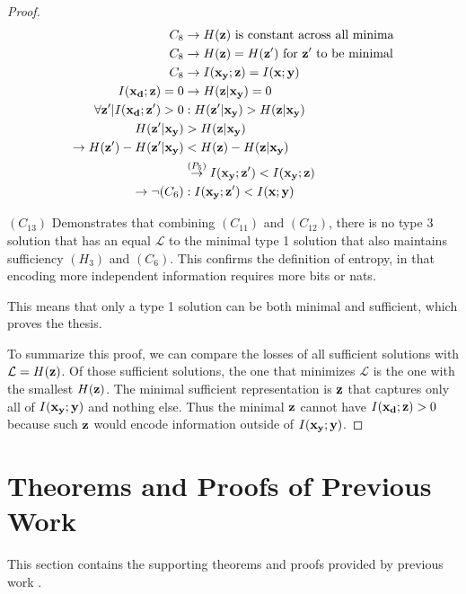 \begin{theorem}
\begin{proof}
$$
\begin{aligned}
    C_8 &\rightarrow  H({\mathbf{z}}) \text{ is constant across all minima}\\
    C_8 &\rightarrow  H({\mathbf{z}}) = H({\mathbf{z}}')\text{ for } {\mathbf{z}}' \text{ to be minimal}\\
    C_8 &\rightarrow  I({\mathbf{x}}_{\mathbf{y}}; {\mathbf{z}}) = I({\mathbf{x}}; {\mathbf{y}})\\
    I({\mathbf{x}}_{\mathbf{d}}; {\mathbf{z}}) = 0 &\rightarrow H({\mathbf{z}}| {\mathbf{x}}_{\mathbf{y}}) = 0 \\
    \forall {\mathbf{z}}'|I({\mathbf{x}}_{\mathbf{d}}; {\mathbf{z}}') > 0  &:  H({\mathbf{z}}'| {\mathbf{x}}_{\mathbf{y}}) > H({\mathbf{z}}| {\mathbf{x}}_{\mathbf{y}}) \\
   H({\mathbf{z}}'| {\mathbf{x}}_{\mathbf{y}}) &> H({\mathbf{z}}| {\mathbf{x}}_{\mathbf{y}}) \\
   \rightarrow H({\mathbf{z}}') - H({\mathbf{z}}'| {\mathbf{x}}_{\mathbf{y}}) &< H({\mathbf{z}}) - H({\mathbf{z}}| {\mathbf{x}}_{\mathbf{y}})  \\
    &\stackrel{\left(P_5\right)}{\rightarrow}  I({\mathbf{x}}_{\mathbf{y}}; {\mathbf{z}}') < I({\mathbf{x}}_{\mathbf{y}}; {\mathbf{z}})  \\
    \rightarrow \neg (C_6) &:  I({\mathbf{x}}_{\mathbf{y}}; {\mathbf{z}}') < I({\mathbf{x}}; {\mathbf{y}})
\end{aligned}
$$

$(C_{13})$ Demonstrates that combining $(C_{11})$ and $(C_{12})$, there is no type 3 solution that has an equal $\mathcal{L}$ to the minimal type 1 solution that also maintains sufficiency $(H_3)$ and $(C_6)$. This confirms the definition of entropy, in that encoding more independent information requires more bits or nats.

This means that only a type 1 solution can be both minimal and sufficient, which proves the thesis.

To summarize this proof, we can compare the losses of all sufficient solutions with $\mathcal{L} = H({\mathbf{z}})$. Of those sufficient solutions, the one that minimizes $\mathcal{L}$ is the one with the smallest $H({\mathbf{z}})$. The minimal sufficient representation is ${\mathbf{z}}$ that captures only all of $I({\mathbf{x}}_{\mathbf{y}}; {\mathbf{y}})$ and nothing else. Thus the minimal ${\mathbf{z}}$ cannot have $I({\mathbf{x}}_{\mathbf{d}}; {\mathbf{z}}) > 0$ because such ${\mathbf{z}}$ would encode information outside of $I({\mathbf{x}}_{\mathbf{y}}; {\mathbf{y}})$.

\end{proof}
    \label{app:domain_genloss}
\end{theorem}

\section{Theorems and Proofs of Previous Work}

This section contains the supporting theorems and proofs provided by previous work \citep{federici2020learning}.

